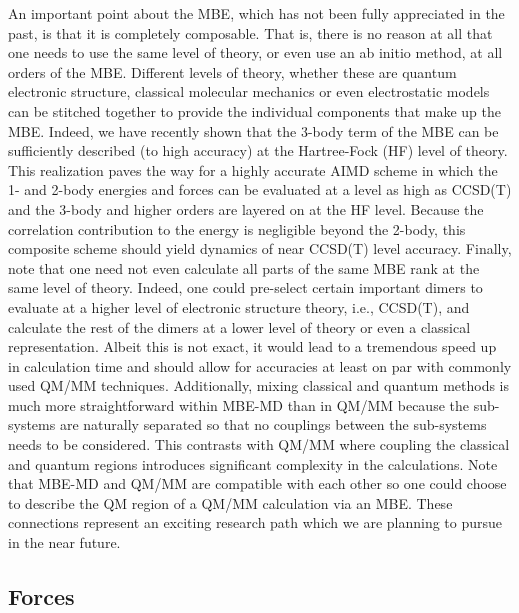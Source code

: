 \documentclass[11pt, proquest]{uwthesis}[2020/02/24]
\begin{document}
\par An important point about the MBE, which has not been fully appreciated in the past, is that it is completely composable. That is, there is no reason at all that one needs to use the same level of theory, or even use an ab initio method, at all orders of the MBE. Different levels of theory, whether these are quantum electronic structure, classical molecular mechanics or even electrostatic models can be stitched together to provide the individual components that make up the MBE. Indeed, we have recently shown that the 3-body term of the MBE can be sufficiently described (to high accuracy) at the Hartree-Fock (HF) level of theory.\autocite{heindel_many-body_2020} This realization paves the way for a highly accurate AIMD scheme in which the 1- and 2-body energies and forces can be evaluated at a level as high as CCSD(T) and the 3-body and higher orders are layered on at the HF level. Because the correlation contribution to the energy is negligible beyond the 2-body, this composite scheme should yield dynamics of near CCSD(T) level accuracy. Finally, note that one need not even calculate all parts of the same MBE rank at the same level of theory. Indeed, one could pre-select certain important dimers to evaluate at a higher level of electronic structure theory, i.e., CCSD(T), and calculate the rest of the dimers at a lower level of theory or even a classical representation. Albeit this is not exact, it would lead to a tremendous speed up in calculation time and should allow for accuracies at least on par with commonly used QM/MM techniques. Additionally, mixing classical and quantum methods is much more straightforward within MBE-MD than in QM/MM because the sub-systems are naturally separated so that no couplings between the sub-systems needs to be considered. This contrasts with QM/MM where coupling the classical and quantum regions introduces significant complexity in the calculations.\autocite{liu_qmmm_2014,laino_efficient_2005,laino_efficient_2006,loco_towards_2019} Note that MBE-MD and QM/MM are compatible with each other so one could choose to describe the QM region of a QM/MM calculation via an MBE. These connections represent an exciting research path which we are planning to pursue in the near future.

\subsection{Forces}
\end{document}
